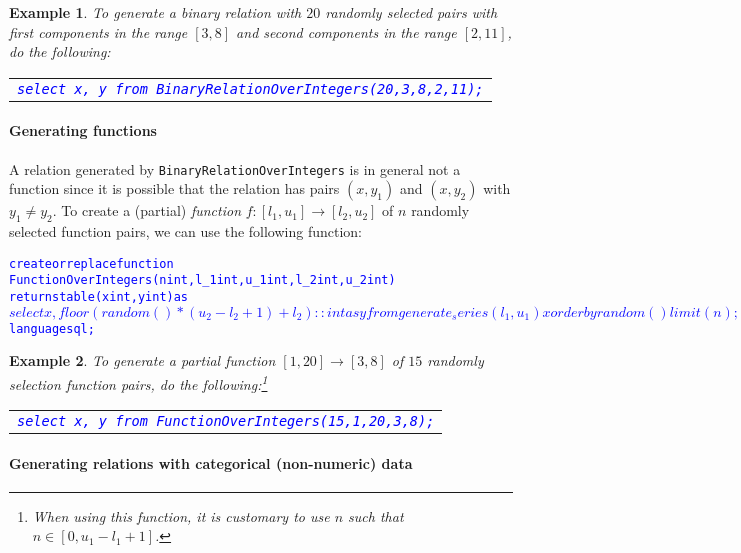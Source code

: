 \documentclass{article}
\newtheorem{example}{Example}
\begin{document}
\begin{example}
To generate a binary relation with $20$ randomly selected pairs with first components in the range $[3,8]$
and second components in the range $[2,11]$,  do the following:
{
\begin{center}
\begin{tabular}{l}
\textcolor{blue}{
{\tt select x, y from BinaryRelationOverIntegers(20,3,8,2,11);}}
\end{tabular}
\end{center}
}
\end{example}

\paragraph{Generating functions}
A relation generated by {\tt BinaryRelationOverIntegers} is in general not a function since it is
possible that the relation has pairs $(x,y_1)$ and $(x,y_2)$ with
$y_1\neq y_2$.
To create a (partial) \emph{function} $f: [l_1,u_1]\rightarrow [l_2,u_2]$ of $n$ randomly selected
function pairs, we can use the following function:
{\small
\begin{alltt}
\textcolor{blue}{create or replace function 
FunctionOverIntegers(n int, l_1 int, u_1 int, l_2 int, u_2 int) 
   returns table (x int, y int) as
$$
   select x, floor(random() * (u_2-l_2+1) + l_2)::int as y
   from   generate_series(l_1,u_1) x order by random() limit(n);
$$ language sql;}
\end{alltt}
}

\begin{example}
To generate a partial function $[1,20]\rightarrow [3,8]$ of $15$ randomly selection function pairs, do the following:\footnote{When using this function, it is customary to use $n$ such that $n\in [0,u_1-l_1+1]$.}
{
\begin{center}
\begin{tabular}{l}
\textcolor{blue}{
{\tt select x, y from FunctionOverIntegers(15,1,20,3,8);}}
\end{tabular}
\end{center}
}
\end{example}

\newpage
\paragraph{Generating relations with categorical (non-numeric) data}
\end{document}
